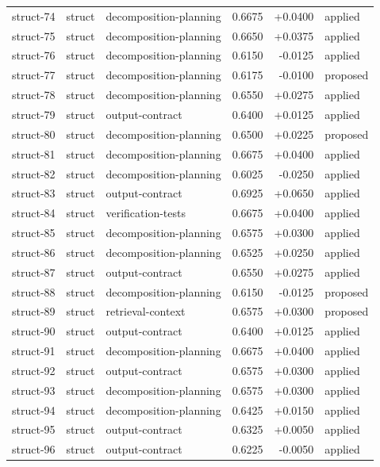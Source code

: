 \begin{center}
\begin{longtable}{llp{5.2cm}rrl}
struct-74 & struct & decomposition-planning & 0.6675 & +0.0400 & applied \\
struct-75 & struct & decomposition-planning & 0.6650 & +0.0375 & applied \\
struct-76 & struct & decomposition-planning & 0.6150 & -0.0125 & applied \\
struct-77 & struct & decomposition-planning & 0.6175 & -0.0100 & proposed \\
struct-78 & struct & decomposition-planning & 0.6550 & +0.0275 & applied \\
struct-79 & struct & output-contract & 0.6400 & +0.0125 & applied \\
struct-80 & struct & decomposition-planning & 0.6500 & +0.0225 & proposed \\
struct-81 & struct & decomposition-planning & 0.6675 & +0.0400 & applied \\
struct-82 & struct & decomposition-planning & 0.6025 & -0.0250 & applied \\
struct-83 & struct & output-contract & 0.6925 & +0.0650 & applied \\
struct-84 & struct & verification-tests & 0.6675 & +0.0400 & applied \\
struct-85 & struct & decomposition-planning & 0.6575 & +0.0300 & applied \\
struct-86 & struct & decomposition-planning & 0.6525 & +0.0250 & applied \\
struct-87 & struct & output-contract & 0.6550 & +0.0275 & applied \\
struct-88 & struct & decomposition-planning & 0.6150 & -0.0125 & proposed \\
struct-89 & struct & retrieval-context & 0.6575 & +0.0300 & proposed \\
struct-90 & struct & output-contract & 0.6400 & +0.0125 & applied \\
struct-91 & struct & decomposition-planning & 0.6675 & +0.0400 & applied \\
struct-92 & struct & output-contract & 0.6575 & +0.0300 & applied \\
struct-93 & struct & decomposition-planning & 0.6575 & +0.0300 & applied \\
struct-94 & struct & decomposition-planning & 0.6425 & +0.0150 & applied \\
struct-95 & struct & output-contract & 0.6325 & +0.0050 & applied \\
struct-96 & struct & output-contract & 0.6225 & -0.0050 & applied \\

\end{longtable}
\end{center}
